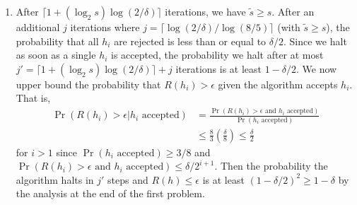 \begin{enumerate}
\begin{enumerate}
        \item 
        After $\lceil 1+(\log_2 s) \log(2/\delta) \rceil$
        iterations, we have $\tilde{s} \geq s$.
        After an additional $j$ iterations where
        $j=\lceil \log(2/\delta)/\log(8/5)\rceil$
        (with $\tilde{s} \geq s$),
        the probability that all $h_i$ are rejected
        is less than or equal to $\delta/2$.
        Since we halt as soon as a single $h_i$ is accepted,
        the probability we halt after at most
        $j' = \lceil 1+(\log_2 s) \log(2/\delta) \rceil + j$ 
        iterations is at least $1-\delta/2$.
        We now upper bound the probability that
        $R(h_i) > \epsilon$ given the algorithm
        accepts $h_i$.
        That is,
        \begin{align}
            \Pr(R(h_i)>\epsilon | h_i \textrm{ accepted})
            &= \frac{\Pr(R(h_i)>\epsilon \textrm{ and }
            h_i \textrm{ accepted})}{\Pr(h_i \textrm{ accepted})}
            \nonumber \\
            &\leq \frac{8}{3}(\frac{\delta}{8}) \leq 
            \frac{\delta}{2}
            \nonumber
        \end{align}
        for $i > 1$ since $\Pr(h_i \textrm{ accepted})
        \geq 3/8$ and $\Pr(R(h_i)>\epsilon \textrm{ and }
        h_i \textrm{ accepted}) \leq \delta/2^{i+1}$.
        Then the probability the algorithm halts
        in $j'$ steps and $R(h)\leq \epsilon$ is
        at least
        $(1-\delta/2)^2 \geq 1-\delta$ by the analysis
        at the end of the first problem.            
    \end{enumerate}

\end{enumerate}
